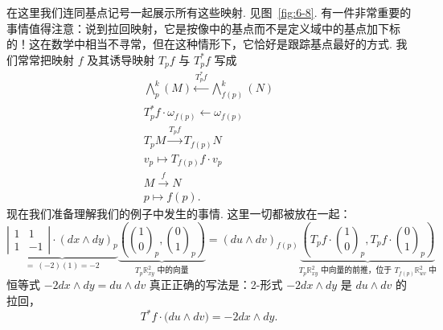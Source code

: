 在这里我们连同基点记号一起展示所有这些映射. 见图~\ref{fig:6-8}. 有一件非常重要的事情值得注意：说到拉回映射，它是按像中的基点而不是定义域中的基点加下标的！这在数学中相当不寻常，但在这种情形下，它恰好是跟踪基点最好的方式. 我们常常把映射 $f$ 及其诱导映射 $T_pf$ 与 $T_p^*f$ 写成
\[
\begin{gathered}
\bigwedge_p^k(M)\xleftarrow{T_p^*f}\bigwedge_{f(p)}^k(N)\\
T_p^*f\cdot\omega_{f(p)}\longleftarrow\omega_{f(p)}\\
T_pM\xrightarrow{T_pf}T_{f(p)}N\\
v_p\longmapsto T_{f(p)}f\cdot v_p\\
M\xrightarrow{f}N\\
p\longmapsto f(p).
\end{gathered}
\]
现在我们准备理解我们的例子中发生的事情. 这里一切都被放在一起：
\[
\underbrace{\left|\begin{matrix}1&1\\1&-1\end{matrix}\right|\cdot(dx\wedge dy)_p}_{=\ (-2)(1)=-2}
\underbrace{\left(\binom{1}{0}_p,\binom{0}{1}_p\right)}_{\text{$T_p\mathbb{R}^2_{xy}$ 中的向量}}
=
(du\wedge dv)_{f(p)}\underbrace{\left(T_pf\cdot\binom{1}{0}_p,T_pf\cdot\binom{0}{1}_p\right)}_{\text{$T_p\mathbb{R}^2_{xy}$ 中向量的前推，位于 $T_{f(p)}\mathbb{R}^2_{uv}$ 中}}
\]
恒等式 $-2dx\wedge dy=du\wedge dv$ 真正正确的写法是：2-形式 $-2dx\wedge dy$ 是 $du\wedge dv$ 的拉回，
\[
T^*f\cdot\bigl(du\wedge dv\bigr)=-2dx\wedge dy.
\]

